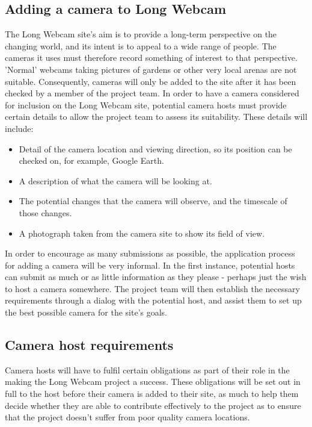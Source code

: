 \documentclass[11pt]{article}
\begin{document}
\subsection{Adding a camera to Long Webcam}
The Long Webcam site's aim is to provide a long-term perspective on the changing world, and its intent is to appeal to a wide range of people. The cameras it uses must therefore record something of interest to that perspective. 'Normal' webcams taking pictures of gardens or other very local arenas are not suitable. Consequently, cameras will only be added to the site after it has been checked by a member of the project team. In order to have a camera considered for inclusion on the Long Webcam site, potential camera hosts must provide certain details to allow the project team to assess its suitability. These details will include:

\begin{itemize}
\item Detail of the camera location and viewing direction, so its position can be checked on, for example, Google Earth.
\item A description of what the camera will be looking at.
\item The potential changes that the camera will observe, and the timescale of those changes.
\item A photograph taken from the camera site to show its field of view.
\end{itemize}

In order to encourage as many submissions as possible, the application process for adding a camera will be very informal. In the first instance, potential hosts can submit as much or as little information as they please - perhaps just the wish to host a camera somewhere. The project team will then establish the necessary requirements through a dialog with the potential host, and assist them to set up the best possible camera for the site's goals.

\subsection{Camera host requirements}
Camera hosts will have to fulfil certain obligations as part of their role in the making the Long Webcam project a success. These obligations will be set out in full to the host before their camera is added to their site, as much to help them decide whether they are able to contribute effectively to the project as to ensure that the project doesn't suffer from poor quality camera locations.
\end{document}
